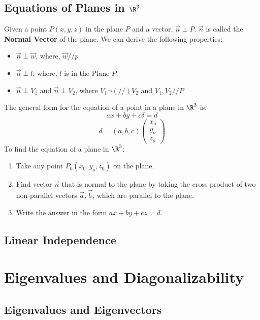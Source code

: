 \documentclass[a4paper]{article}
\begin{document}
  \subsection[Equations of Planes]{Equations of Planes in $\R^3$}
  Given a point $P(x,y,z)$ in the plane $P$ and a vector, $\vec{n} \perp P$. $\vec{n}$ is called the \textbf{Normal Vector} of the plane. We can derive the following properties:
  \begin{itemize}
    \item $\vec{n} \perp \vec{w}$, where, $\vec{w} // p $
    \item $\vec{n} \perp l$, where, $l$ is in the Plane $P$.
    \item $\vec{n} \perp V_1$ and $\vec{n} \perp V_2$, where $V_1 \lnot (//) V_2$ and $V_1,V_2 // P$
  \end{itemize}
  The general form for the equation of a point in a plane in $\R^3$ is:
  \[
    ax + by + c\delta = d
  \]
  \[
    d = (a,b,c)
    \begin{pmatrix}
      x_o \\ y_o \\ z_o
    \end{pmatrix}
  \]
  To find the equation of a plane in $\R^3$:
  \begin{enumerate}
    \item Take any point $P_0(x_0,y_o,z_0)$ on the plane.
    \item Find vector $\vec{n}$ that is normal to the plane by taking the cross product of two non-parallel vectors $\vec{a},\vec{b}$, which are parallel to the plane.
    \item Write the answer in the form $ax+by+cz = d$.
  \end{enumerate}
  \subsection{Linear Independence}
  \section{Eigenvalues and Diagonalizability}
  \subsection{Eigenvalues and Eigenvectors}
\end{document}
